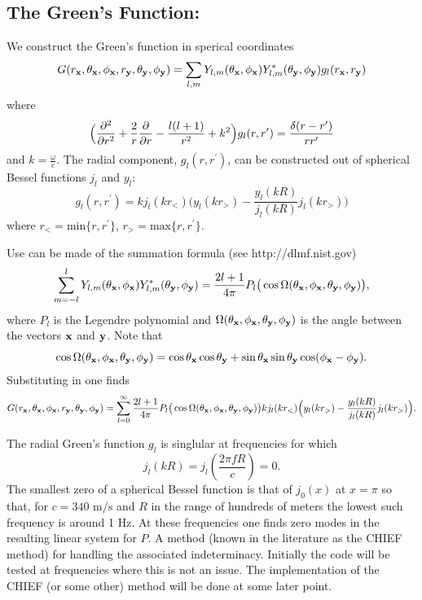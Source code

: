 \subsection{The Green's Function:}\label{subsec:greens_func}

We construct the Green's function in sperical coordinates \cite{williams1999fourier}
\[
G(r_{\bf x},\theta_{\bf x},\phi_{\bf x},r_{\bf y},\theta_{\bf y},\phi_{\bf y})
=
\sum_{l,m}Y_{l,m}(\theta_{\bf x},\phi_{\bf x})Y_{l,m}^*(\theta_{\bf y},\phi_{\bf y})g_l(r_{\bf x},r_{\bf y})
\]
where 
\[
\Big(\frac{\partial^2}{\partial r^2} + \frac{2}{r}\frac{\partial}{\partial r} - \frac{l(l+1)}{r^2} +k^2\Big)g_l(r,r^\prime)
=\frac{\delta(r-r^\prime)}{rr^\prime}
\]
and $k=\frac{\omega}{c}$. The radial component, $g_l(r,r^\prime)$, can be constructed out of spherical Bessel functions $j_l$ and $y_l$: 
\[
g_l(r,r^\prime)=kj_l(kr_<)\Big(y_l(kr_>)-\frac{y_l(kR)}{j_l(kR)}j_l(kr_>)\Big)
\]
where $r_<=\text{min}\{r,r^\prime\}$,  $r_>=\text{max}\{r,r^\prime\}$. 

Use can be made of the summation formula (see http://dlmf.nist.gov)
\[
\sum_{m=-l}^lY_{l,m}(\theta_{\bf x},\phi_{\bf x})Y_{l,m}^*(\theta_{\bf y},\phi_{\bf y})
=
\frac{2l+1}{4\pi}P_l\big(\cos\Omega(\theta_{\bf x},\phi_{\bf x},\theta_{\bf y},\phi_{\bf y})\big),
\]
where $P_l$ is the Legendre polynomial and $\Omega(\theta_{\bf x},\phi_{\bf x},\theta_{\bf y},\phi_{\bf y})$ is the angle between the vectors ${\bf x}$ and ${\bf y}$. Note that 
\[
\cos\Omega(\theta_{\bf x},\phi_{\bf x},\theta_{\bf y},\phi_{\bf y})=\cos\theta_{\bf x}\cos\theta_{\bf y}+\sin\theta_{\bf x}\sin\theta_{\bf y}\cos(\phi_{\bf x}-\phi_{\bf y}). 
\]
Substituting in one finds
\begin{equation}\label{eq:greens_function}
G(r_{\bf x},\theta_{\bf x},\phi_{\bf x},r_{\bf y},\theta_{\bf y},\phi_{\bf y})
=
\sum_{l=0}^\infty\frac{2l+1}{4\pi}P_l\big(\cos\Omega(\theta_{\bf x},\phi_{\bf x},\theta_{\bf y},\phi_{\bf y})\big)
kj_l(kr_<)\Big(y_l(kr_>)-\frac{y_l(kR)}{j_l(kR)}j_l(kr_>)\Big).
\end{equation}

The radial Green's function $g_l$ is singlular at frequencies for which 
\[
j_l(kR)=j_l(\frac{2\pi fR}{c})=0.
\]
The smallest zero of a spherical Bessel function is that of $j_0(x)$ at $x=\pi$ so that, for $c=340\text{ m/s}$ and $R$ in the range of hundreds of meters the lowest such frequency is around 1 Hz. At these frequencies one finds zero modes in the resulting linear system for $P$. A method (known in the literature as the CHIEF method) for handling the associated indeterminacy. Initially the code will be tested at frequencies where this is not an issue. The implementation of the CHIEF (or some other) method will be done at some later point. 

